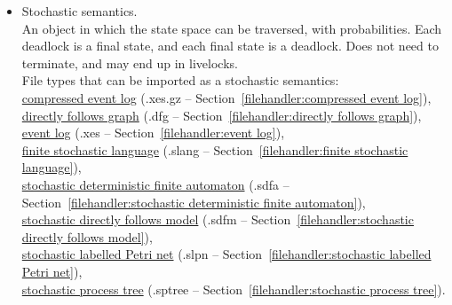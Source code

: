 {\begin{itemize}
\\Commands that accept a stochastic deterministic semantics as input: \\\null\qquad\hyperref[command:Ebi analyse all-traces]{\texttt{Ebi analyse all-traces}} (Section~\ref{command:Ebi analyse all-traces})\\\null\qquad\hyperref[command:Ebi analyse coverage]{\texttt{Ebi analyse coverage}} (Section~\ref{command:Ebi analyse coverage})\\\null\qquad\hyperref[command:Ebi analyse minimum-probability-traces]{\texttt{Ebi analyse minimum-probability-traces}} (Section~\ref{command:Ebi analyse minimum-probability-traces})\\\null\qquad\hyperref[command:Ebi analyse mode]{\texttt{Ebi analyse mode}} (Section~\ref{command:Ebi analyse mode})\\\null\qquad\hyperref[command:Ebi analyse most-likely-traces]{\texttt{Ebi analyse most-likely-traces}} (Section~\ref{command:Ebi analyse most-likely-traces})
\item Stochastic semantics.
\\An object in which the state space can be traversed, with probabilities. Each deadlock is a final state, and each final state is a deadlock. Does not need to terminate, and may end up in livelocks.
\\File types that can be imported as a stochastic semantics: \\\null\qquad\hyperref[filehandler:compressed event log]{compressed event log} (.xes.gz -- Section~\ref{filehandler:compressed event log}), \\\null\qquad\hyperref[filehandler:directly follows graph]{directly follows graph} (.dfg -- Section~\ref{filehandler:directly follows graph}), \\\null\qquad\hyperref[filehandler:event log]{event log} (.xes -- Section~\ref{filehandler:event log}), \\\null\qquad\hyperref[filehandler:finite stochastic language]{finite stochastic language} (.slang -- Section~\ref{filehandler:finite stochastic language}), \\\null\qquad\hyperref[filehandler:stochastic deterministic finite automaton]{stochastic deterministic finite automaton} (.sdfa -- Section~\ref{filehandler:stochastic deterministic finite automaton}), \\\null\qquad\hyperref[filehandler:stochastic directly follows model]{stochastic directly follows model} (.sdfm -- Section~\ref{filehandler:stochastic directly follows model}), \\\null\qquad\hyperref[filehandler:stochastic labelled Petri net]{stochastic labelled Petri net} (.slpn -- Section~\ref{filehandler:stochastic labelled Petri net}), \\\null\qquad\hyperref[filehandler:stochastic process tree]{stochastic process tree} (.sptree -- Section~\ref{filehandler:stochastic process tree}).

\end{itemize}}

